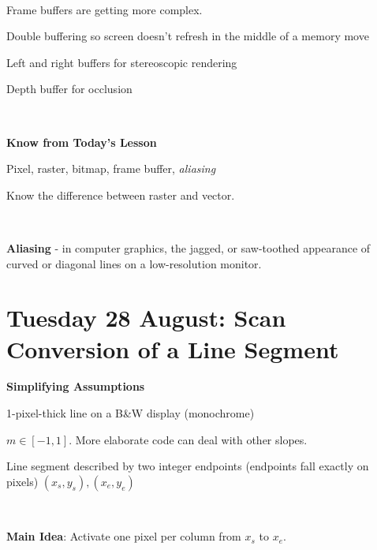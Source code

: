 \documentclass[12pt]{article}
\begin{document}
\begin{spacing}{1.2}
\

Frame buffers are getting more complex.  

\qquad Double buffering so screen doesn't refresh in the middle of a memory move

\qquad Left and right buffers for stereoscopic rendering

\qquad Depth buffer for occlusion

\

{\bf Know from Today's Lesson}

Pixel, raster, bitmap, frame buffer, {\it aliasing}

Know the difference between raster and vector.  

\

{\bf Aliasing} - in computer graphics, the jagged, or saw-toothed appearance of curved or diagonal lines on a low-resolution monitor.

\section{Tuesday 28 August:  Scan Conversion of a Line Segment}

{\bf Simplifying Assumptions}

1-pixel-thick line on a B\&W display (monochrome)

$m \in [-1,1]$.  More elaborate code can deal with other slopes.

Line segment described by two integer endpoints (endpoints fall exactly on pixels) $(x_s,y_s), (x_e,y_e)$

\

\hfil{}

{\bf Main Idea}:  Activate one pixel per column from $x_s$ to $x_e$.  

\

\hfil{}


\end{spacing}
\end{document}
